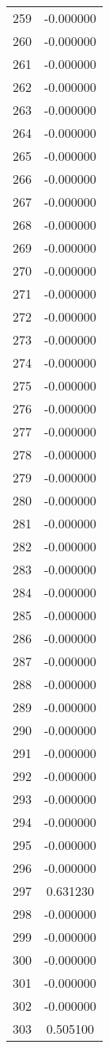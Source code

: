 \documentclass[12pt]{article}
\begin{document}
\begin{longtable}{@{}cc@{}}
259 & -0.000000 \\
260 & -0.000000 \\
261 & -0.000000 \\
262 & -0.000000 \\
263 & -0.000000 \\
264 & -0.000000 \\
265 & -0.000000 \\
266 & -0.000000 \\
267 & -0.000000 \\
268 & -0.000000 \\
269 & -0.000000 \\
270 & -0.000000 \\
271 & -0.000000 \\
272 & -0.000000 \\
273 & -0.000000 \\
274 & -0.000000 \\
275 & -0.000000 \\
276 & -0.000000 \\
277 & -0.000000 \\
278 & -0.000000 \\
279 & -0.000000 \\
280 & -0.000000 \\
281 & -0.000000 \\
282 & -0.000000 \\
283 & -0.000000 \\
284 & -0.000000 \\
285 & -0.000000 \\
286 & -0.000000 \\
287 & -0.000000 \\
288 & -0.000000 \\
289 & -0.000000 \\
290 & -0.000000 \\
291 & -0.000000 \\
292 & -0.000000 \\
293 & -0.000000 \\
294 & -0.000000 \\
295 & -0.000000 \\
296 & -0.000000 \\
297 & 0.631230 \\
298 & -0.000000 \\
299 & -0.000000 \\
300 & -0.000000 \\
301 & -0.000000 \\
302 & -0.000000 \\
303 & 0.505100 \\

\end{longtable}
\end{document}
